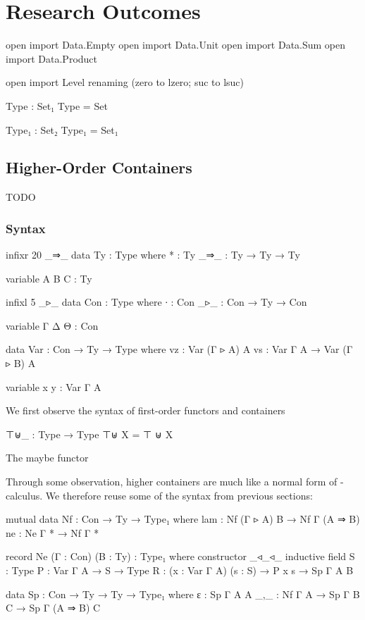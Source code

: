 \chapter{Research Outcomes}

\begin{code}[hide]
open import Data.Empty
open import Data.Unit
open import Data.Sum
open import Data.Product

open import Level renaming (zero to lzero; suc to lsuc)

Type : Set₁
Type = Set

Type₁ : Set₂
Type₁ = Set₁
\end{code}

\section{Higher-Order Containers}

TODO

\subsection{Syntax}

\begin{code}[hide]
infixr 20 _⇒_
data Ty : Type where
  * : Ty
  _⇒_ : Ty → Ty → Ty

variable A B C : Ty

infixl 5 _▹_
data Con : Type where
  ∙   : Con
  _▹_ : Con → Ty → Con

variable Γ Δ Θ : Con

data Var : Con → Ty → Type where
  vz : Var (Γ ▹ A) A
  vs : Var Γ A → Var (Γ ▹ B) A

variable x y : Var Γ A
\end{code}

We first observe the syntax of first-order functors and containers

\begin{code}
⊤⊎_ : Type → Type
⊤⊎ X = ⊤ ⊎ X
\end{code}

The maybe functor 

Through some observation, higher containers are much like a normal form of \lambda-calculus. We therefore reuse some of the syntax from previous sections:

\begin{code}
mutual
  data Nf : Con → Ty → Type₁ where
    lam : Nf (Γ ▹ A) B → Nf Γ (A ⇒ B)
    ne  : Ne Γ * → Nf Γ *

  record Ne (Γ : Con) (B : Ty) : Type₁ where
    constructor _◃_◃_
    inductive
    field
      S : Type
      P : Var Γ A → S → Type
      R : (x : Var Γ A) (s : S) → P x s → Sp Γ A B

  data Sp : Con → Ty → Ty → Type₁ where
    ε   : Sp Γ A A
    _,_ : Nf Γ A → Sp Γ B C → Sp Γ (A ⇒ B) C
\end{code}

